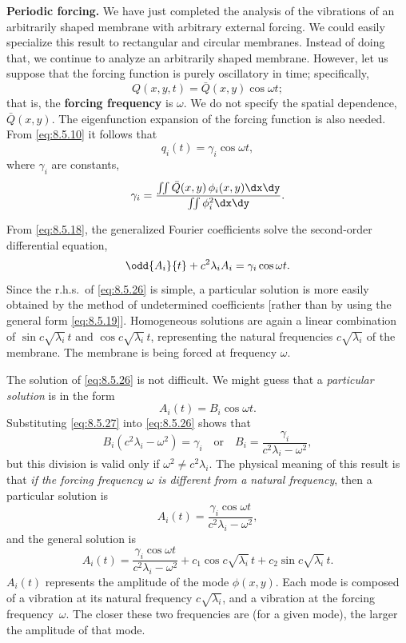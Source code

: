 \textbf{Periodic forcing.}
We have just completed the analysis of the vibrations of an arbitrarily shaped membrane with arbitrary external forcing.  We could easily specialize this result to rectangular and circular membranes.  Instead of doing that, we continue to analyze an arbitrarily shaped membrane.  However, let us suppose that the forcing function is purely oscillatory in time; specifically,
\begin{equation}
\label{eq:8.5.24}
\boxed{Q(x,y,t) = \bar{Q}(x,y)\cos\omega t;}
\end{equation}
that is, the \textbf{forcing frequency} is $\omega$.  We do not specify the spatial dependence, $\bar{Q}(x,y)$.  The eigenfunction expansion of the forcing function is also needed.  From \eqref{eq:8.5.10} it follows that
\begin{equation}
\label{eq:8.5.25}
q_i(t) = \gamma_i\cos\omega t,
\end{equation}
where $\gamma_i$ are constants,
\[
\gamma_i = \frac{\iint \bar{Q}(x,y)\,\phi_i(x,y)\dx\dy}{\iint \phi_i^2\dx\dy}.
\]

From \eqref{eq:8.5.18}, the generalized Fourier coefficients solve the second-order differential equation,
\begin{equation}
\label{eq:8.5.26}
\odd{A_i}{t} + c^2\lambda_i A_i = \gamma_i\cos\omega t.
\end{equation}
Since the r.h.s.\ of \eqref{eq:8.5.26} is simple, a particular solution is more easily obtained by the method of undetermined coefficients [rather than by using the general form \eqref{eq:8.5.19}].  Homogeneous solutions are again a linear combination of $\sin c\sqrt{\lambda_i}\,t$ and $\cos c\sqrt{\lambda_i}\,t$, representing the natural frequencies $c\sqrt{\lambda_i}$ of the membrane.  The membrane is being forced at frequency $\omega$.

The solution of \eqref{eq:8.5.26} is not difficult.  We might guess that a \emph{particular solution} is in the form
\begin{equation}
\label{eq:8.5.27}
A_i(t) = B_i\cos\omega t.
\end{equation}
Substituting \eqref{eq:8.5.27} into \eqref{eq:8.5.26} shows that
\[
B_i(c^2\lambda_i - \omega^2) = \gamma_i \quad\text{or}\quad
B_i = \frac{\gamma_i}{c^2\lambda_i - \omega^2},
\]
but this division is valid only if $\omega^2\neq c^2\lambda_i$.  The physical meaning of this result is that \emph{if the forcing frequency $\omega$ is different from a natural frequency}, then a particular solution is
\begin{equation}
\label{eq:8.5.28}
A_i(t) = \frac{\gamma_i\cos\omega t}{c^2\lambda_i - \omega^2},
\end{equation}
and the general solution is
\begin{equation}
\label{eq:8.5.29}
A_i(t) = \frac{\gamma_i\cos\omega t}{c^2\lambda_i - \omega^2}
+ c_1\cos c\sqrt{\lambda_i}\,t + c_2\sin c\sqrt{\lambda_i}\,t.
\end{equation}
$A_i(t)$ represents the amplitude of the mode $\phi(x,y)$.  Each mode is composed of a vibration at its natural frequency $c\sqrt{\lambda_i}$, and a vibration at the forcing frequency~$\omega$.  The closer these two frequencies are (for a given mode), the larger the amplitude of that mode.

